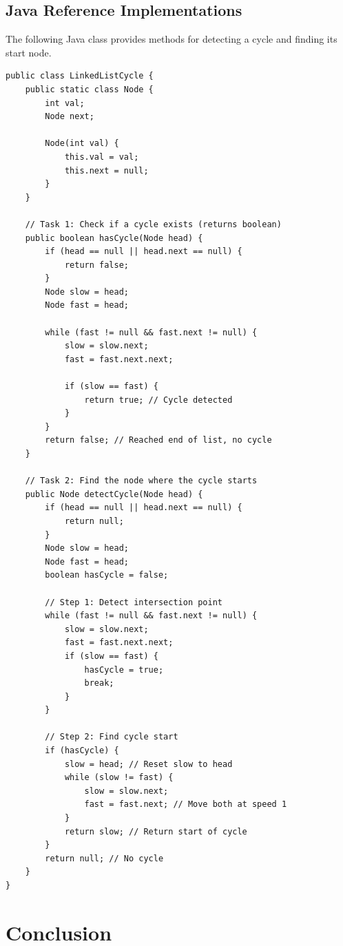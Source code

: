 \documentclass[10pt,journal,compsoc,onecolumn]{IEEEtran}
\begin{document}
\subsection{Java Reference Implementations}

The following Java class provides methods for detecting a cycle and finding its start node.

\begin{verbatim}
public class LinkedListCycle {
    public static class Node {
        int val;
        Node next;

        Node(int val) {
            this.val = val;
            this.next = null;
        }
    }

    // Task 1: Check if a cycle exists (returns boolean)
    public boolean hasCycle(Node head) {
        if (head == null || head.next == null) {
            return false;
        }
        Node slow = head;
        Node fast = head;

        while (fast != null && fast.next != null) {
            slow = slow.next;
            fast = fast.next.next;

            if (slow == fast) {
                return true; // Cycle detected
            }
        }
        return false; // Reached end of list, no cycle
    }

    // Task 2: Find the node where the cycle starts
    public Node detectCycle(Node head) {
        if (head == null || head.next == null) {
            return null;
        }
        Node slow = head;
        Node fast = head;
        boolean hasCycle = false;

        // Step 1: Detect intersection point
        while (fast != null && fast.next != null) {
            slow = slow.next;
            fast = fast.next.next;
            if (slow == fast) {
                hasCycle = true;
                break;
            }
        }

        // Step 2: Find cycle start
        if (hasCycle) {
            slow = head; // Reset slow to head
            while (slow != fast) {
                slow = slow.next;
                fast = fast.next; // Move both at speed 1
            }
            return slow; // Return start of cycle
        }
        return null; // No cycle
    }
}
\end{verbatim}

\section{Conclusion}
\label{sec:conclusion}
\end{document}
